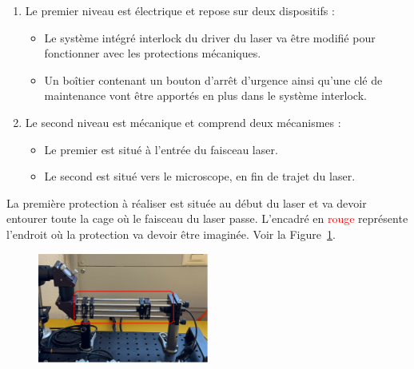 \begin{enumerate}
    \item Le premier niveau est électrique et repose sur deux dispositifs :
          \begin{itemize}[label=\textbullet]
              \item Le système intégré interlock du driver du laser va être modifié pour fonctionner avec les protections mécaniques.
              \item Un boîtier contenant un bouton d'arrêt d'urgence ainsi qu'une clé de maintenance vont être apportés en plus dans le système interlock.
          \end{itemize}
    \item Le second niveau est mécanique et comprend deux mécanismes :
          \begin{itemize}[label=\textbullet]
              \item Le premier est situé à l'entrée du faisceau laser.
              \item Le second est situé vers le microscope, en fin de trajet du laser.
          \end{itemize}
\end{enumerate}
\begin{minipage}{\textwidth}
    La première protection à réaliser est située au début du laser et va devoir entourer toute la cage où le faisceau du laser passe. L'encadré en \textcolor{red}{rouge} représente l'endroit où la protection va devoir être imaginée. Voir la Figure~\ref{protection_laser_début}.

    \begin{figure}[H]
        \begin{center}
            \includegraphics[width=0.5\textwidth]{assets/figures/Introduction/protection_debut_laser.png}
        \end{center}
        \label{protection_laser_début}
    \end{figure}
\end{minipage}

